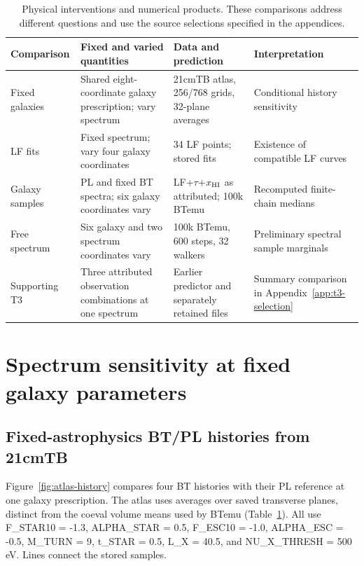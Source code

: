 \begin{table}[t]\centering\small
\caption{Physical interventions and numerical products. These comparisons address different questions and use the source selections specified in the appendices.}\label{tab:experiment-map}
\begin{tabular}{p{}p{}p{}p{}}\toprule
Comparison & Fixed and varied quantities & Data and prediction & Interpretation\\\midrule
Fixed galaxies & Shared eight-coordinate galaxy prescription; vary spectrum & 21cmTB atlas, 256/768 grids, 32-plane averages & Conditional history sensitivity\\
LF fits & Fixed spectrum; vary four galaxy coordinates & 34 LF points; stored fits & Existence of compatible LF curves\\
Galaxy samples & PL and fixed BT spectra; six galaxy coordinates vary & LF+$\tau$+$x_{\rm HI}$ as attributed; 100k BTemu & Recomputed finite-chain medians\\
Free spectrum & Six galaxy and two spectrum coordinates vary & 100k BTemu, 600 steps, 32 walkers & Preliminary spectral sample marginals\\
Supporting T3 & Three attributed observation combinations at one spectrum & Earlier predictor and separately retained files & Summary comparison in Appendix~\ref{app:t3-selection}\\\bottomrule
\end{tabular}\end{table}

\section{Spectrum sensitivity at fixed galaxy parameters}\label{development-results}

\subsection{Fixed-astrophysics BT/PL histories from 21cmTB}\label{fixed-astrophysics-btpl-histories-from-21cmtb}

Figure~\ref{fig:atlas-history} compares four BT histories with their PL reference at one galaxy prescription. The atlas uses averages over saved transverse planes, distinct from the coeval volume means used by BTemu (Table~\ref{tab:experiment-map}). All use F\_STAR10 = -1.3, ALPHA\_STAR = 0.5, F\_ESC10 = -1.0, ALPHA\_ESC = -0.5, M\_TURN = 9, t\_STAR = 0.5, L\_X = 40.5, and NU\_X\_THRESH = 500 eV. Lines connect the stored samples.

